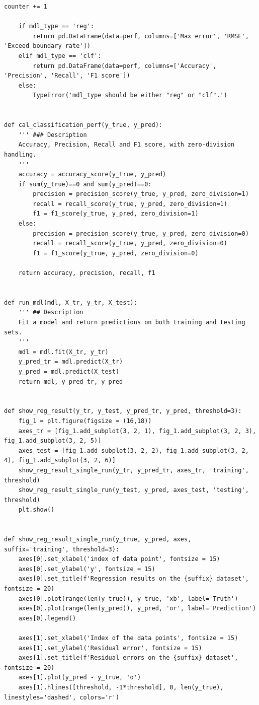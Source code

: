\documentclass[11pt,a4paper]{article}
\begin{document}
\begin{lstlisting}[style=pyfull]
        counter += 1

    if mdl_type == 'reg':
        return pd.DataFrame(data=perf, columns=['Max error', 'RMSE', 'Exceed boundary rate'])
    elif mdl_type == 'clf':
        return pd.DataFrame(data=perf, columns=['Accuracy', 'Precision', 'Recall', 'F1 score'])
    else:
        TypeError('mdl_type should be either "reg" or "clf".')


def cal_classification_perf(y_true, y_pred):
    ''' ### Description
    Accuracy, Precision, Recall and F1 score, with zero-division handling.
    '''
    accuracy = accuracy_score(y_true, y_pred)
    if sum(y_true)==0 and sum(y_pred)==0:
        precision = precision_score(y_true, y_pred, zero_division=1)
        recall = recall_score(y_true, y_pred, zero_division=1)
        f1 = f1_score(y_true, y_pred, zero_division=1)
    else:
        precision = precision_score(y_true, y_pred, zero_division=0)
        recall = recall_score(y_true, y_pred, zero_division=0)
        f1 = f1_score(y_true, y_pred, zero_division=0)

    return accuracy, precision, recall, f1


def run_mdl(mdl, X_tr, y_tr, X_test):
    ''' ## Description
    Fit a model and return predictions on both training and testing sets.
    '''
    mdl = mdl.fit(X_tr, y_tr)
    y_pred_tr = mdl.predict(X_tr)
    y_pred = mdl.predict(X_test)
    return mdl, y_pred_tr, y_pred


def show_reg_result(y_tr, y_test, y_pred_tr, y_pred, threshold=3):
    fig_1 = plt.figure(figsize = (16,18))
    axes_tr = [fig_1.add_subplot(3, 2, 1), fig_1.add_subplot(3, 2, 3), fig_1.add_subplot(3, 2, 5)]
    axes_test = [fig_1.add_subplot(3, 2, 2), fig_1.add_subplot(3, 2, 4), fig_1.add_subplot(3, 2, 6)]
    show_reg_result_single_run(y_tr, y_pred_tr, axes_tr, 'training', threshold)
    show_reg_result_single_run(y_test, y_pred, axes_test, 'testing', threshold)
    plt.show()


def show_reg_result_single_run(y_true, y_pred, axes, suffix='training', threshold=3):
    axes[0].set_xlabel('index of data point', fontsize = 15)
    axes[0].set_ylabel('y', fontsize = 15)
    axes[0].set_title(f'Regression results on the {suffix} dataset', fontsize = 20)
    axes[0].plot(range(len(y_true)), y_true, 'xb', label='Truth')
    axes[0].plot(range(len(y_pred)), y_pred, 'or', label='Prediction')
    axes[0].legend()

    axes[1].set_xlabel('Index of the data points', fontsize = 15)
    axes[1].set_ylabel('Residual error', fontsize = 15)
    axes[1].set_title(f'Residual errors on the {suffix} dataset', fontsize = 20)
    axes[1].plot(y_pred - y_true, 'o')
    axes[1].hlines([threshold, -1*threshold], 0, len(y_true), linestyles='dashed', colors='r')


\end{lstlisting}
\end{document}
